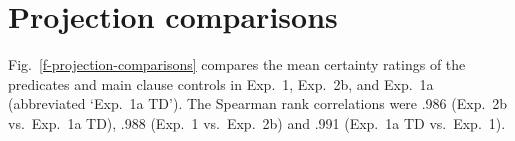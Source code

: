 \documentclass[11pt,fleqn]{article}
\newcommand{\figref}[1]{Fig.~\ref{#1}}
\newcommand{\6}{\mbox{$[\hspace*{-.6mm}[$}}
\newcommand{\9}{\mbox{$]\hspace*{-.6mm}]$}}
\begin{document}
%
%
%
%

\section{Projection comparisons}\label{a-comparison}

\figref{f-projection-comparisons} compares the mean certainty ratings of the predicates and main clause controls in Exp.~1, Exp.~2b, and  Exp.~1a (abbreviated `Exp.~1a TD'). The Spearman rank correlations were .986 (Exp.~2b vs.\ Exp.~1a TD), .988 (Exp.~1 vs.\ Exp.~2b) and .991 (Exp.~1a TD vs.\  Exp.~1).
\end{document}
